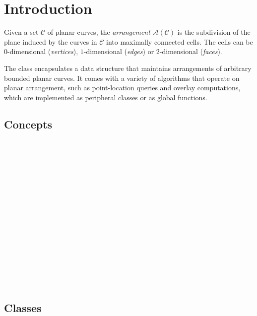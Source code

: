 \section*{Introduction}
\label{arr_ref_sec:intro}
Given a set $\mathcal{C}$ of planar curves, the {\em arrangement}
${\mathcal A}({\mathcal C})$ is the subdivision of the plane induced
by the curves in $\mathcal{C}$ into maximally connected cells. The cells
can be $0$-dimensional ({\em vertices}), $1$-dimensional ({\em edges})
or $2$-dimensional ({\em faces}).

The class  encapsulates a data structure
that maintains arrangements of arbitrary bounded planar curves. It comes
with a variety of algorithms that operate on planar arrangement,
such as point-location queries and overlay computations, which are
implemented as peripheral classes or as global functions.

\subsection*{Concepts}

\\
\\
\\
\\
~\\
\\
\\
\\
\\
~\\
\\
 \\
\\
~\\
\\

\subsection*{Classes}


